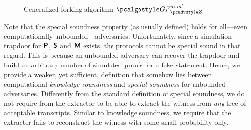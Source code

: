 	\begin{figure}[t]
		\centering
\caption{Generalized forking algorithm $\genforking_{\zdv}^{m, m'}$
  }
	\label{fig:genforking_lemma}
\end{figure}


\fi



\iffalse
Note that the special soundness property (as usually defined) holds for
all---even computationally unbounded---adversaries. Unfortunately, since a
simulation trapdoor for $\bm{\mathsf{P}}$, $\bm{\mathsf{S}}$ and $\bm{\mathsf{M}}$ exists, the protocols
cannot be special sound in that regard. This is because an unbounded adversary
can recover the trapdoor and build an arbitrary number of simulated proofs for a fake
statement. Hence, we provide a weaker, yet sufficient, definition that somehow lies between 
computational \emph{knowledge soundness} and \emph{special soundness} for unbounded adversaries. Differently from the standard definition of special soundness, we do not require from the extractor to be able to extract the witness from \emph{any} tree of acceptable transcripts. Similar to knowledge soundness, we require that the extractor fails to reconstruct the witness with some small probability only. 

